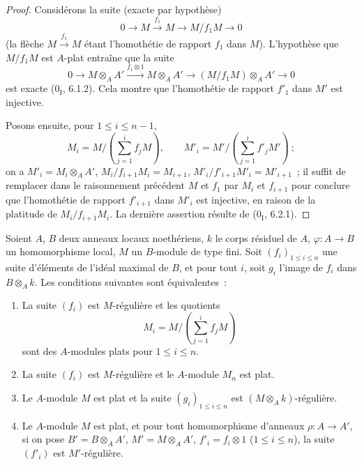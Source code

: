 \begin{proof}
Considérons la suite (exacte par hypothèse)
\[
  0\longrightarrow M\xrightarrow{f_1}M\longrightarrow M/f_1M
  \longrightarrow0
\]
(la flèche $M\xrightarrow{f_1}M$ étant l'homothétie de rapport $f_1$ dans
$M$). L'hypothèse que $M/f_1M$ est $A$-plat entraîne que la suite
\[
  0\longrightarrow M\otimes_A A'
  \xrightarrow{f_1\otimes1}M\otimes_A A'
  \longrightarrow(M/f_1M)\otimes_A A'\longrightarrow0
\]
est exacte ($0_{\mathrm I}$, 6.1.2). Cela montre que l'homothétie de rapport
$f'_1$ dans $M'$ est injective.

Posons ensuite, pour $1\leq i\leq n-1$,
\[
  M_i=M/\left(\sum_{j=1}^i f_jM\right),\qquad
  M'_i=M'/\left(\sum_{j=1}^i f'_jM'\right)~;
\]
on a $M'_i=M_i\otimes_A A'$, $M_i/f_{i+1}M_i=M_{i+1}$,
$M'_i/f'_{i+1}M'_i=M'_{i+1}$~; il suffit de remplacer dans le raisonnement
précédent $M$ et $f_1$ par $M_i$ et $f_{i+1}$ pour conclure que l'homothétie
de rapport $f'_{i+1}$ dans $M'_i$ est injective, en raison de la platitude de
$M_i/f_{i+1}M_i$. La dernière assertion résulte de ($0_{\mathrm I}$, 6.2.1).
\end{proof}

\begin{proposition}[15.1.16]
\label{0.15.1.16-fr}
Soient $A$, $B$ deux anneaux locaux noethériens, $k$ le corps résiduel de
$A$, $\varphi:A\to B$ un homomorphisme local, $M$ un $B$-module de type fini.
Soit $(f_i)_{1\leq i\leq n}$ une suite d'éléments de l'idéal maximal de $B$,
et pour tout $i$, soit $g_i$ l'image de $f_i$ dans $B\otimes_A k$. Les
conditions suivantes sont équivalentes~:
\begin{enumerate}
  \item[\rm(a)] La suite $(f_i)$ est $M$-régulière et les quotients
  \[
    M_i=M/\left(\sum_{j=1}^i f_jM\right)
  \]
  sont des $A$-modules plats pour $1\leq i\leq n$.
  \item[\rm(b)] La suite $(f_i)$ est $M$-régulière et le $A$-module $M_n$ est
  plat.
  \item[\rm(c)] Le $A$-module $M$ est plat et la suite
  $(g_i)_{1\leq i\leq n}$ est $(M\otimes_A k)$-régulière.
  \item[\rm(d)] Le $A$-module $M$ est plat, et pour tout homomorphisme
  d'anneaux $\rho:A\to A'$, si on pose $B'=B\otimes_A A'$,
  $M'=M\otimes_A A'$, $f'_i=f_i\otimes1$ ($1\leq i\leq n$), la suite
  $(f'_i)$ est $M'$-régulière.
\end{enumerate}
\end{proposition}

